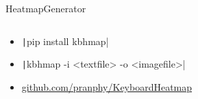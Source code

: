 \documentclass[aspectratio=169]{beamer}
\newcommand{\code}[2][python]{\texttt|#2|}
\begin{document}
%
%
%
\begin{frame}{HeatmapGenerator}
    \begin{columns}
        \begin{column}{0.49\textwidth}
            \begin{itemize}
                \item \code[bash]{pip install kbhmap}
                \item \code[bash]{kbhmap -i <textfile> -o <imagefile>}
                \item \hspace{-2mm}\url{github.com/pranphy/KeyboardHeatmap}
            \end{itemize}
        \end{column}
        \begin{column}{0.49\textwidth}
            \vspace{-5mm} 
            \begin{figure}[h!]
            \end{figure}
        \end{column}
    \end{columns}
\end{frame} 
%
%
%
\end{document}
